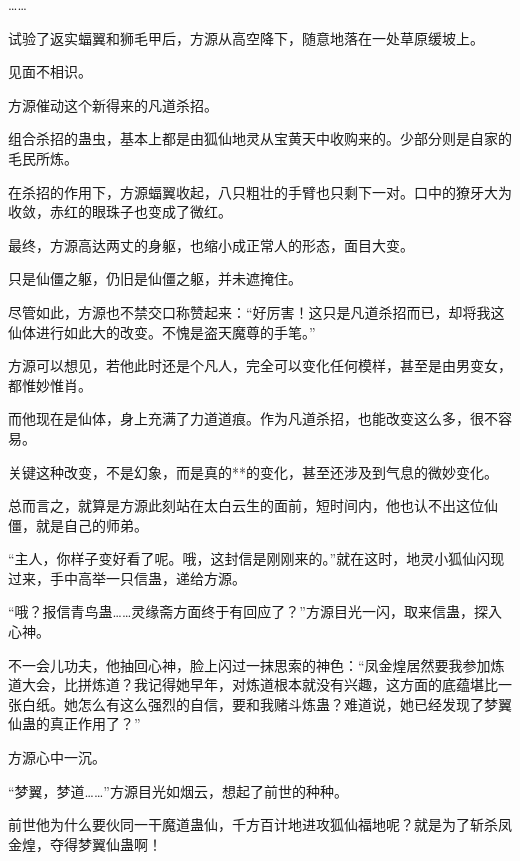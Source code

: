 \begin{this_body}
……

试验了返实蝠翼和狮毛甲后，方源从高空降下，随意地落在一处草原缓坡上。

见面不相识。

方源催动这个新得来的凡道杀招。

组合杀招的蛊虫，基本上都是由狐仙地灵从宝黄天中收购来的。少部分则是自家的毛民所炼。

在杀招的作用下，方源蝠翼收起，八只粗壮的手臂也只剩下一对。口中的獠牙大为收敛，赤红的眼珠子也变成了微红。

最终，方源高达两丈的身躯，也缩小成正常人的形态，面目大变。

只是仙僵之躯，仍旧是仙僵之躯，并未遮掩住。

尽管如此，方源也不禁交口称赞起来：“好厉害！这只是凡道杀招而已，却将我这仙体进行如此大的改变。不愧是盗天魔尊的手笔。”

方源可以想见，若他此时还是个凡人，完全可以变化任何模样，甚至是由男变女，都惟妙惟肖。

而他现在是仙体，身上充满了力道道痕。作为凡道杀招，也能改变这么多，很不容易。

关键这种改变，不是幻象，而是真的**的变化，甚至还涉及到气息的微妙变化。

总而言之，就算是方源此刻站在太白云生的面前，短时间内，他也认不出这位仙僵，就是自己的师弟。

“主人，你样子变好看了呢。哦，这封信是刚刚来的。”就在这时，地灵小狐仙闪现过来，手中高举一只信蛊，递给方源。

“哦？报信青鸟蛊……灵缘斋方面终于有回应了？”方源目光一闪，取来信蛊，探入心神。

不一会儿功夫，他抽回心神，脸上闪过一抹思索的神色：“凤金煌居然要我参加炼道大会，比拼炼道？我记得她早年，对炼道根本就没有兴趣，这方面的底蕴堪比一张白纸。她怎么有这么强烈的自信，要和我赌斗炼蛊？难道说，她已经发现了梦翼仙蛊的真正作用了？”

方源心中一沉。

“梦翼，梦道……”方源目光如烟云，想起了前世的种种。

前世他为什么要伙同一干魔道蛊仙，千方百计地进攻狐仙福地呢？就是为了斩杀凤金煌，夺得梦翼仙蛊啊！

\end{this_body}

